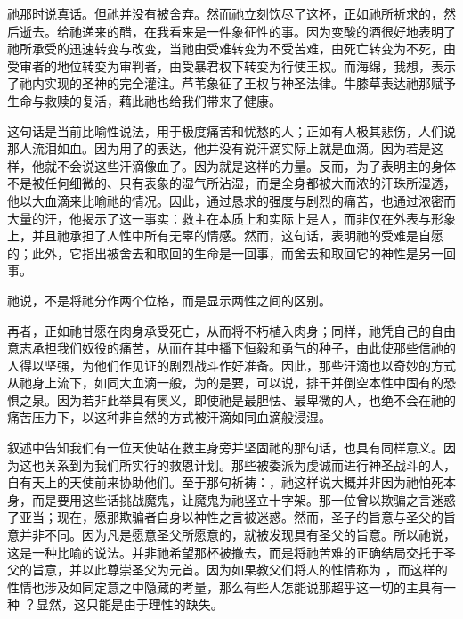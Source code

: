 祂那时说真话。但祂并没有被舍弃。然而祂立刻饮尽了这杯，正如祂所祈求的，然后逝去。给祂递来的醋，在我看来是一件象征性的事。因为变酸的酒很好地表明了祂所承受的迅速转变与改变，当祂由受难转变为不受苦难，由死亡转变为不死，由受审者的地位转变为审判者，由受暴君权下转变为行使王权。而海绵，我想，表示了祂内实现的圣神的完全灌注。芦苇象征了王权与神圣法律。牛膝草表达祂那赋予生命与救赎的复活，藉此祂也给我们带来了健康。\par

\par

\par

这句话是当前比喻性说法，用于极度痛苦和忧愁的人；正如有人极其悲伤，人们说那人流泪如血。因为用了的表达，他并没有说汗滴实际上就是血滴。因为若是这样，他就不会说这些汗滴像血了。因为就是这样的力量。反而，为了表明主的身体不是被任何细微的、只有表象的湿气所沾湿，而是全身都被大而浓的汗珠所湿透，他以大血滴来比喻祂的情况。因此，通过恳求的强度与剧烈的痛苦，也通过浓密而大量的汗，他揭示了这一事实：救主在本质上和实际上是人，而非仅在外表与形象上，并且祂承担了人性中所有无辜的情感。然而，这句话，表明祂的受难是自愿的；此外，它指出被舍去和取回的生命是一回事，而舍去和取回它的神性是另一回事。\par

祂说，不是将祂分作两个位格，而是显示两性之间的区别。\par

再者，正如祂甘愿在肉身承受死亡，从而将不朽植入肉身；同样，祂凭自己的自由意志承担我们奴役的痛苦，从而在其中播下恒毅和勇气的种子，由此使那些信祂的人得以坚强，为他们作见证的剧烈战斗作好准备。因此，那些汗滴也以奇妙的方式从祂身上流下，如同大血滴一般，为的是要，可以说，排干并倒空本性中固有的恐惧之泉。因为若非此举具有奥义，即使祂是最胆怯、最卑微的人，也绝不会在祂的痛苦压力下，以这种非自然的方式被汗滴如同血滴般浸湿。\par

叙述中告知我们有一位天使站在救主身旁并坚固祂的那句话，也具有同样意义。因为这也关系到为我们所实行的救恩计划。那些被委派为虔诚而进行神圣战斗的人，自有天上的天使前来协助他们。至于那句祈祷：，祂这样说大概并非因为祂怕死本身，而是要用这些话挑战魔鬼，让魔鬼为祂竖立十字架。那一位曾以欺骗之言迷惑了亚当；现在，愿那欺骗者自身以神性之言被迷惑。然而，圣子的旨意与圣父的旨意并非不同。因为凡是愿意圣父所愿意的，就被发现具有圣父的旨意。所以祂说，这是一种比喻的说法。并非祂希望那杯被撤去，而是将祂苦难的正确结局交托于圣父的旨意，并以此尊崇圣父为元首。因为如果教父们将人的性情称为 ，而这样的性情也涉及如同定意之中隐藏的考量，那么有些人怎能说那超乎这一切的主具有一种 ？显然，这只能是由于理性的缺失。\par

